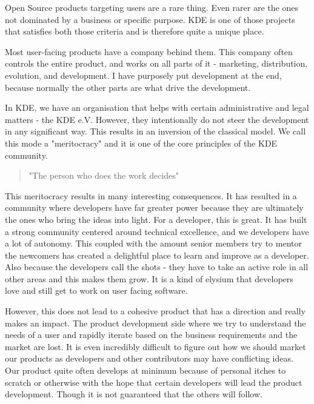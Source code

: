 


\noindent{}Open Source products targeting users are a rare thing. Even rarer are the ones not dominated by a business or specific purpose. KDE is one of those projects that satisfies both those criteria and is therefore quite a unique place.

Most user-facing products have a company behind them. This company often controls the entire product, and works on all parts of it - marketing, distribution, evolution, and development. I have purposely put development at the end, because normally the other parts are what drive the development.

In KDE, we have an organisation that helps with certain administrative and legal matters - the KDE e.V. However, they intentionally do not steer the development in any significant way. This results in an inversion of the classical model. We call this mode a "meritocracy" and it is one of the core principles of the KDE community.

\begin{quote}"The person who does the work decides"\end{quote}

This meritocracy results in many interesting consequences. It has resulted in a community where developers have far greater power because they are ultimately the ones who bring the ideas into light. For a developer, this is great. It has built a strong community centered around technical excellence, and we developers have a lot of autonomy. This coupled with the amount senior members try to mentor the newcomers has created a delightful place to learn and improve as a developer. Also because the developers call the shots - they have to take an active role in all other areas and this makes them grow. It is a kind of elysium that developers love and still get to work on user facing software.

However, this does not lead to a cohesive product that has a direction and really makes an impact. The product development side where we try to understand the needs of a user and rapidly iterate based on the business requirements and the market are lost. It is even incredibly difficult to figure out how we should market our products as developers and other contributors may have conflicting ideas. Our product quite often develops at minimum because of personal itches to scratch or otherwise with the hope that certain developers will lead the product development. Though it is not guaranteed that the others will follow.

